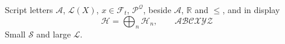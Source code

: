 \documentclass{article}
\begin{document}
Script letters $\mathscr{A}$, $\mathscr{L}(X)$, $x \in \mathscr{F}_t$, $\mathscr{P}^{\mathscr{Q}}$,
beside $\mathcal{A}$, $\mathbb{R}$ and $\leqslant$, and in display
\[
\mathscr{H} = \bigoplus_{n} \mathscr{H}_n, \qquad \mathscr{ABCXYZ}
\]
{\small Small $\mathscr{S}$} and {\large large $\mathscr{L}$.}
\end{document}
